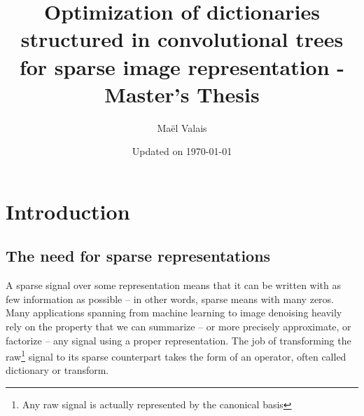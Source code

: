 


\author{Maël Valais}
\date{Updated on \today}
\title{Optimization of dictionaries structured in convolutional trees for sparse image representation - Master's Thesis}


\chapter{Introduction}
\section{The need for sparse representations}
A sparse signal over some representation means that it can be written with as few information as possible – in other words, sparse means with many zeros. Many applications spanning from machine learning to image denoising heavily rely on the property that we can summarize – or more precisely approximate, or factorize – any signal using a proper representation. The job of transforming the raw\footnote{Any raw signal is actually represented by the canonical basis} signal to its sparse counterpart takes the form of an operator, often called dictionary or transform.

